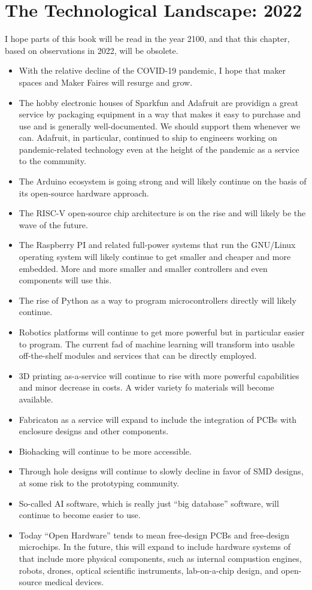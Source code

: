 \documentclass[
	fontsize=10pt, %
	twoside=false, %
	secnumdepth=1, %
]{kaobook}
\begin{document}
\chapter{The Technological Landscape: 2022}

I hope parts of this book will be read in the year 2100, and that this chapter,
based on observations in 2022,
will be obsolete.
\begin{itemize}
\item With the relative decline of the COVID-19 pandemic, I hope
  that maker spaces and Maker Faires will resurge and grow.
\item The hobby electronic houses of Sparkfun and Adafruit are
  providign a great service by packaging equipment in a way that
  makes it easy to purchase and use and is generally well-documented.
  We should support them whenever we can. Adafruit, in particular, continued
  to ship to engineers working on pandemic-related technology even at the height
  of the pandemic as a service to the community.
\item The Arduino ecosystem is going strong and will likely continue
  on the basis of its open-source hardware approach.
\item The RISC-V open-source chip architecture is on the rise and will
  likely be the wave of the future.
\item The Raspberry PI and related full-power systems that run the GNU/Linux
  operating system will likely continue to get smaller and cheaper and more
  embedded. More and more smaller and smaller controllers and even components
  will use this.
\item The rise of Python as a way to program microcontrollers directly will
  likely continue.
\item Robotics platforms will continue to get more powerful but in particular
  easier to program. The current fad of machine learning will transform into
  usable off-the-shelf modules and services that can be directly employed.
\item 3D printing as-a-service will continue to rise with more powerful
  capabilities and minor decrease in costs. A wider variety fo materials
  will become available.
\item Fabricaton as a service will expand to include the integration
  of PCBs with enclosure designs and other components.
\item Biohacking will continue to be more accessible.
\item Through hole designs will continue to slowly decline in favor
  of SMD designs, at some risk to the prototyping community.
\item So-called AI software, which is really just ``big database'' software,
  will continue to become easier to use.
\item Today ``Open Hardware'' tends to mean free-design PCBs and free-design
  microchips. In the future, this will expand to include hardware systems
  of that include more physical components, such as internal compustion engines,
  robots, drones, optical scientific instruments, lab-on-a-chip design, and
  open-source medical devices.
\end{itemize}
\end{document}
